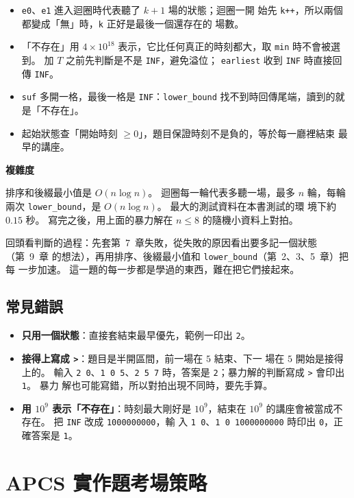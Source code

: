 \begin{itemize}
\item \texttt{e0}、\texttt{e1} 進入迴圈時代表聽了 $k + 1$ 場的狀態；迴圈一開
始先 \texttt{k++}，所以兩個都變成「無」時，\texttt{k} 正好是最後一個還存在的
場數。
\item 「不存在」用 $4 \times 10^{18}$ 表示，它比任何真正的時刻都大，取
\texttt{min} 時不會被選到。 加 $T$ 之前先判斷是不是 \texttt{INF}，避免溢位；
\texttt{earliest} 收到 \texttt{INF} 時直接回傳 \texttt{INF}。
\item \texttt{suf} 多開一格，最後一格是 \texttt{INF}：\texttt{lower\_bound}
找不到時回傳尾端，讀到的就是「不存在」。
\item 起始狀態查「開始時刻 $\ge 0$」，題目保證時刻不是負的，等於每一廳裡結束
最早的講座。
\end{itemize}

\textbf{複雜度}

排序和後綴最小值是 $O(n \log n)$。 迴圈每一輪代表多聽一場，最多 $n$ 輪，每輪
兩次 \texttt{lower\_bound}，是 $O(n \log n)$。 最大的測試資料在本書測試的環
境下約 $0.15$ 秒。 寫完之後，用上面的暴力解在 $n \le 8$ 的隨機小資料上對拍。

回頭看判斷的過程：先套第~7~章失敗，從失敗的原因看出要多記一個狀態（第~9~章
的想法），再用排序、後綴最小值和 \texttt{lower\_bound}（第~2、3、5~章）把每
一步加速。 這一題的每一步都是學過的東西，難在把它們接起來。

\subsection{常見錯誤}

\begin{itemize}
\item \textbf{只用一個狀態}：直接套結束最早優先，範例一印出 \texttt{2}。
\item \textbf{接得上寫成 \texttt{>}}：題目是半開區間，前一場在 $5$ 結束、下一
場在 $5$ 開始是接得上的。 輸入 \texttt{2 0}、\texttt{1 0 5}、\texttt{2 5 7}
時，答案是 \texttt{2}；暴力解的判斷寫成 \texttt{>} 會印出 \texttt{1}。 暴力
解也可能寫錯，所以對拍出現不同時，要先手算。
\item \textbf{用 $10^9$ 表示「不存在」}：時刻最大剛好是 $10^9$，結束在
$10^9$ 的講座會被當成不存在。 把 \texttt{INF} 改成 \texttt{1000000000}，輸
入 \texttt{1 0}、\texttt{1 0 1000000000} 時印出 \texttt{0}，正確答案是
\texttt{1}。
\end{itemize}

\section{APCS 實作題考場策略}
\label{sec:cap-apcs}

